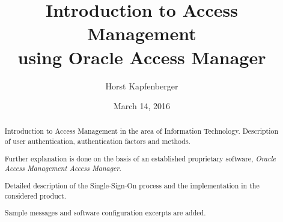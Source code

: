 \documentclass[11pt]{report}
\title{Introduction to Access Management \\
using Oracle Access Manager}
\author{Horst Kapfenberger}
\date{March 14, 2016}
\begin{document}
\maketitle

\begin{abstract}
    Introduction to Access Management in the area of Information
    Technology.  Description of user authentication, authentication
    factors and methods.
   
    Further explanation is done on the basis of an established
    proprietary software, \emph{Oracle Access Management Access
    Manager}.
    
    Detailed description of the Single-Sign-On process and the
    implementation in the considered product.

    Sample messages and software configuration excerpts are added.
\end{abstract}



\tableofcontents









\end{document}
